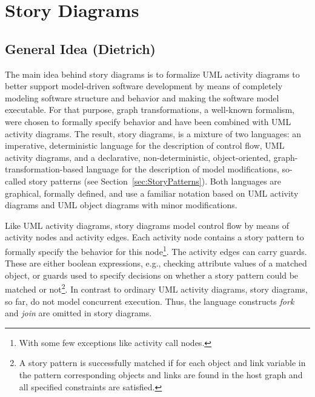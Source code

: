 \section{Story Diagrams} \label{sec:StoryDiagrams}

\subsection{General Idea (Dietrich)}


The main idea behind story diagrams is to formalize UML activity diagrams
to better support model-driven software development
by means of completely modeling software structure and behavior and making the software model executable.
For that purpose, graph transformations, a well-known formalism, were chosen to formally specify behavior and have been combined with UML activity diagrams.
The result, story diagrams, is a mixture of two languages:
an imperative, deterministic language for the description of control flow, UML activity diagrams,
and a declarative, non-deterministic, object-oriented, graph-transformation-based language for the description of model modifications, so-called story patterns (see Section~\ref{sec:StoryPatterns}).
Both languages are graphical, formally defined, and use a familiar notation based on UML activity diagrams  and UML object diagrams with minor modifications.

Like UML activity diagrams, story diagrams model control flow by means of activity nodes and activity edges.
Each activity node contains a story pattern to formally specify the behavior for this node\footnote{With some few exceptions like activity call nodes.}.
The activity edges can carry guards.
These are either boolean expressions, e.g., checking attribute values of a matched object,
or guards used to specify decisions on whether a story pattern could be
matched or not\footnote{A story pattern is successfully matched if for each object and link variable in the pattern corresponding objects and links are found in the host graph and all specified constraints are satisfied.}.
In contrast to ordinary UML activity diagrams, story diagrams, so far, do not model concurrent execution.
Thus, the language constructs \emph{fork} and \emph{join} are omitted in story diagrams.

